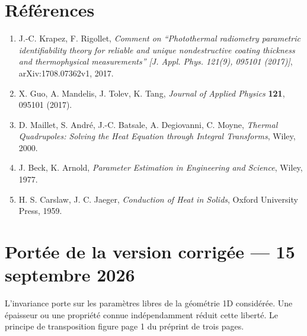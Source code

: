 \documentclass[11pt,a4paper]{article}
\begin{document}
\section{Références}

\begin{enumerate}[leftmargin=2.2em]
\item J.-C. Krapez, F. Rigollet, \emph{Comment on ``Photothermal radiometry parametric identifiability
theory for reliable and unique nondestructive coating thickness and thermophysical measurements''
[J. Appl. Phys. 121(9), 095101 (2017)]}, arXiv:1708.07362v1, 2017.
\item X. Guo, A. Mandelis, J. Tolev, K. Tang, \emph{Journal of Applied Physics} \textbf{121}, 095101
(2017).
\item D. Maillet, S. André, J.-C. Batsale, A. Degiovanni, C. Moyne, \emph{Thermal Quadrupoles: Solving
the Heat Equation through Integral Transforms}, Wiley, 2000.
\item J. Beck, K. Arnold, \emph{Parameter Estimation in Engineering and Science}, Wiley, 1977.
\item H. S. Carslaw, J. C. Jaeger, \emph{Conduction of Heat in Solids}, Oxford University Press, 1959.
\end{enumerate}
\section*{Portée de la version corrigée --- 15 septembre 2026}
L'invariance porte sur les paramètres libres de la géométrie 1D considérée. Une épaisseur ou une propriété connue indépendamment réduit cette liberté. Le principe de transposition figure page 1 du préprint de trois pages.
\end{document}
